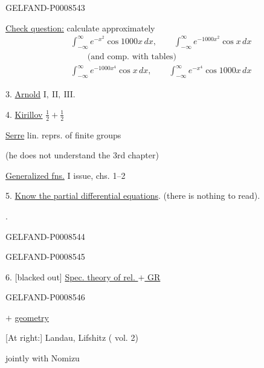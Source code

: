 \begin{GelfandAdjacentEvidence}{GELFAND-P000854}{3}


\uline{Check question:} calculate approximately
\[
\begin{aligned}
&\int_{-\infty}^{\infty} e^{-x^2}\cos 1000x\,dx,\qquad
 \int_{-\infty}^{\infty} e^{-1000x^2}\cos x\,dx\\
&\qquad\text{(and comp. with tables)}\\[.3em]
&\int_{-\infty}^{\infty} e^{-1000x^4}\cos x\,dx,\qquad
 \int_{-\infty}^{\infty} e^{-x^4}\cos 1000x\,dx
\end{aligned}
\]

3. \uline{Arnold} \(\mathrm{I},\ \mathrm{II},\ \mathrm{III}.\)

4. \uline{Kirillov} \(\tfrac12+\tfrac12\)

\uline{Serre} lin. reprs. of finite groups

(he does not understand the 3rd chapter)

\uline{Generalized fns.} \(\mathrm{I}\) issue, chs. 1–2

5. \uline{Know the partial differential equations}. (there is nothing to read).


.
\end{GelfandAdjacentEvidence}
\begin{GelfandAdjacentEvidence}{GELFAND-P000854}{4}

\end{GelfandAdjacentEvidence}
\begin{GelfandAdjacentEvidence}{GELFAND-P000854}{5}


6. [blacked out] \uline{Spec. theory of rel. \(+\) GR}
\end{GelfandAdjacentEvidence}
\begin{GelfandAdjacentEvidence}{GELFAND-P000854}{6}


\(+\) \uline{geometry}

[At right:] Landau, Lifshitz ( vol. 2)

jointly with Nomizu
\end{GelfandAdjacentEvidence}
